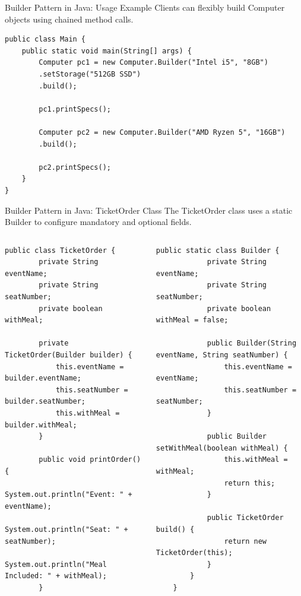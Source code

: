 \documentclass[aspectratio=169, table]{beamer}
\begin{document}
\begin{frame}[fragile]{Builder Pattern in Java: Usage Example}
\vspace{20pt}
Clients can flexibly build Computer objects using chained method calls.

\begin{lstlisting}[style=JavaStyle]
public class Main {
	public static void main(String[] args) {
		Computer pc1 = new Computer.Builder("Intel i5", "8GB")
		.setStorage("512GB SSD")
		.build();
		
		pc1.printSpecs();
		
		Computer pc2 = new Computer.Builder("AMD Ryzen 5", "16GB")
		.build();
		
		pc2.printSpecs();
	}
}
\end{lstlisting}
\end{frame}

\begin{frame}[fragile]{Builder Pattern in Java: TicketOrder Class}
\vspace{30pt}
The TicketOrder class uses a static Builder to configure mandatory and optional fields.

\begin{columns}[T]
\begin{lstlisting}[style=JavaStyle, basicstyle=\ttfamily\tiny]
	public class TicketOrder {
		private String eventName;
		private String seatNumber;
		private boolean withMeal;
		
		private TicketOrder(Builder builder) {
			this.eventName = builder.eventName;
			this.seatNumber = builder.seatNumber;
			this.withMeal = builder.withMeal;
		}
		
		public void printOrder() {
			System.out.println("Event: " + eventName);
			System.out.println("Seat: " + seatNumber);
			System.out.println("Meal Included: " + withMeal);
		}
	\end{lstlisting}
	
	\begin{lstlisting}[style=JavaStyle, basicstyle=\ttfamily\tiny]
		public static class Builder {
			private String eventName;
			private String seatNumber;
			private boolean withMeal = false;
			
			public Builder(String eventName, String seatNumber) {
				this.eventName = eventName;
				this.seatNumber = seatNumber;
			}
			
			public Builder setWithMeal(boolean withMeal) {
				this.withMeal = withMeal;
				return this;
			}
			
			public TicketOrder build() {
				return new TicketOrder(this);
			}
		}
	}
\end{lstlisting}
\end{columns}
\end{frame}
\end{document}
